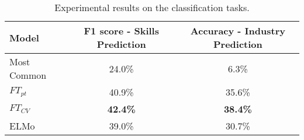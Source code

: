 \begin{table}[tb]
\caption{Experimental results on the classification tasks.\label{tab:classif}}
\vspace{-10pt}
\centering\scriptsize
\begin{tabular}{@{}lcc@{}}
\toprule
Model     & F1 score - Skills Prediction       & Accuracy - Industry Prediction        \\
\midrule
Most Common           & 24.0\%          & 6.3\%            \\
$FT_{pt}$  & 40.9\% & 35.6\% \\
$FT_{CV}$  & \textbf{42.4\%}          & \textbf{38.4\%}         \\
ELMo                  & 39.0\%         & 30.7\% \\
\bottomrule
\end{tabular}
\vspace{-5pt}
\end{table}
